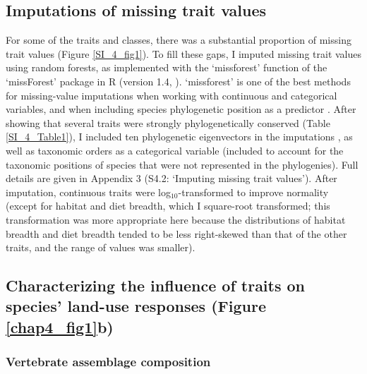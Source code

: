 \subsection{Imputations of missing trait values}
For some of the traits and classes, there was a substantial proportion of missing trait values (Figure \ref{SI_4_fig1}). To fill these gaps, I imputed missing trait values using random forests, as implemented with the `missforest’ function of the `missForest’ package in R (version 1.4, \citet{Stekhoven2012, Stekhoven2016}). `missforest' is one of the best methods for missing-value imputations when working with continuous and categorical variables, and when including species phylogenetic position as a predictor \citep{Penone2014, Debastiani2021}. After showing that several traits were strongly phylogenetically conserved (Table \ref{SI_4_Table1}), I included ten phylogenetic eigenvectors in the imputations \citep{Penone2014}, as well as taxonomic orders as a categorical variable (included to account for the taxonomic positions of species that were not represented in the phylogenies). Full details are given in Appendix 3 (S4.2: `Imputing missing trait values'). After imputation, continuous traits were log$_{10}$-transformed to improve normality (except for habitat and diet breadth, which I square-root transformed; this transformation was more appropriate here because the distributions of habitat breadth and diet breadth tended to be less right-skewed than that of the other traits, and the range of values was smaller).

\subsection{Characterizing the influence of traits on species' land-use responses (Figure \ref{chap4_fig1}b)}

\subsubsection{Vertebrate assemblage composition}

